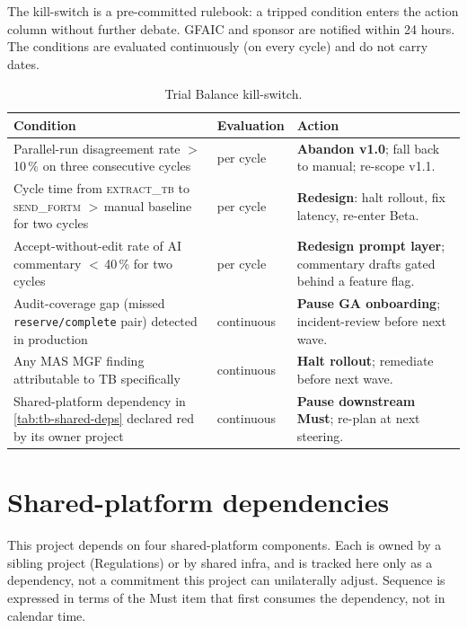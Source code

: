 \documentclass[11pt,a4paper,twoside]{report}
\newcommand{\stateid}[1]{\textsc{\lowercase{#1}}}
\begin{document}
The kill-switch is a pre-committed rulebook: a tripped condition enters
the action column without further debate. GFAIC and sponsor are
notified within 24 hours. The conditions are evaluated continuously
(on every cycle) and do not carry dates.

\begin{table}[htbp]
\centering
\caption{Trial Balance kill-switch.}
\label{tab:tb-kill-switch}
\footnotesize
\begin{tabularx}{\linewidth}{@{}l l X@{}}
\toprule
\textbf{Condition} & \textbf{Evaluation} & \textbf{Action} \\ \midrule
Parallel-run disagreement rate $>$\,10\,\% on three consecutive cycles & per cycle & \textbf{Abandon v1.0}; fall back to manual; re-scope v1.1. \\
Cycle time from \stateid{EXTRACT\_TB} to \stateid{SEND\_FORTM} $>$\,manual baseline for two cycles & per cycle & \textbf{Redesign}: halt rollout, fix latency, re-enter Beta. \\
Accept-without-edit rate of AI commentary $<$\,40\,\% for two cycles & per cycle & \textbf{Redesign prompt layer}; commentary drafts gated behind a feature flag. \\
Audit-coverage gap (missed \texttt{reserve/complete} pair) detected in production & continuous & \textbf{Pause GA onboarding}; incident-review before next wave. \\
Any MAS MGF finding attributable to TB specifically & continuous & \textbf{Halt rollout}; remediate before next wave. \\
Shared-platform dependency in \cref{tab:tb-shared-deps} declared red by its owner project & continuous & \textbf{Pause downstream Must}; re-plan at next steering. \\
\bottomrule
\end{tabularx}
\end{table}

\section{Shared-platform dependencies}\label{sec:tb-shared-deps}

This project depends on four shared-platform components. Each is owned
by a sibling project (Regulations) or by shared infra, and is tracked
here only as a dependency, not a commitment this project can
unilaterally adjust. Sequence is expressed in terms of the Must item
that first consumes the dependency, not in calendar time.
\end{document}
